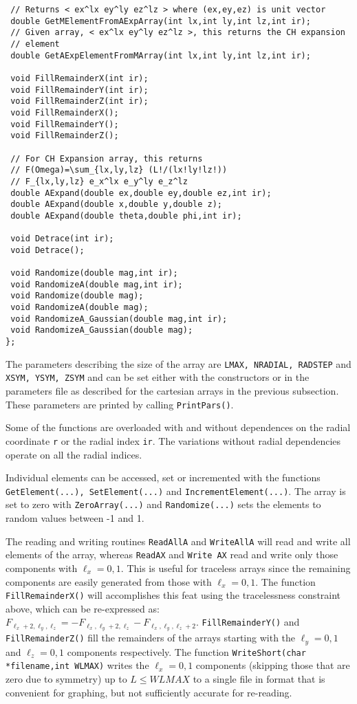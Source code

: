 \documentclass[10pt]{article}
\begin{document}
\begin{verbatim}
 // Returns < ex^lx ey^ly ez^lz > where (ex,ey,ez) is unit vector
 double GetMElementFromAExpArray(int lx,int ly,int lz,int ir);
 // Given array, < ex^lx ey^ly ez^lz >, this returns the CH expansion 
 // element 
 double GetAExpElementFromMArray(int lx,int ly,int lz,int ir);

 void FillRemainderX(int ir);
 void FillRemainderY(int ir);
 void FillRemainderZ(int ir);
 void FillRemainderX();
 void FillRemainderY();
 void FillRemainderZ();

 // For CH Expansion array, this returns
 // F(Omega)=\sum_{lx,ly,lz} (L!/(lx!ly!lz!))
 // F_{lx,ly,lz} e_x^lx e_y^ly e_z^lz
 double AExpand(double ex,double ey,double ez,int ir);
 double AExpand(double x,double y,double z);
 double AExpand(double theta,double phi,int ir);

 void Detrace(int ir);
 void Detrace();

 void Randomize(double mag,int ir);
 void RandomizeA(double mag,int ir);
 void Randomize(double mag);
 void RandomizeA(double mag); 
 void RandomizeA_Gaussian(double mag,int ir);
 void RandomizeA_Gaussian(double mag);
};
\end{verbatim}
The parameters describing the size of the array are {\tt LMAX, NRADIAL, RADSTEP} and {\tt XSYM, YSYM, ZSYM} and can be set either with the constructors or in the parameters file as described for the cartesian arrays in the previous subsection. These parameters are printed by calling {\tt PrintPars()}.

Some of the functions are overloaded with and without dependences on the radial coordinate {\tt r} or the radial index {\tt ir}. The variations without radial dependencies operate on all the radial indices.

Individual elements can be accessed, set or incremented with the functions {\tt GetElement(...), SetElement(...)} and {\tt IncrementElement(...)}. The array is set to zero with {\tt ZeroArray(...)} and {\tt Randomize(...)} sets the elements to random values between -1 and 1.

The reading and writing routines {\tt ReadAllA} and {\tt WriteAllA} will read and write all elements of the array, whereas {\tt ReadAX} and {\tt Write AX} read and write only those components with $\ell_x=0,1$. This is useful for traceless arrays since the remaining components are easily generated from those with $\ell_x=0,1$. The function {\tt FillRemainderX()} will accomplishes this feat using the tracelessness constraint above, which can be re-expressed as: $F_{\ell_x+2,\ell_y,\ell_z}=-F_{\ell_x,\ell_y+2,\ell_z}-F_{\ell_x,\ell_y,\ell_z+2}$. {\tt FillRemainderY()} and {\tt FillRemainderZ()} fill the remainders of the arrays starting with the $\ell_y=0,1$ and $\ell_z=0,1$ components respectively. The function {\tt WriteShort(char *filename,int WLMAX)} writes the $\ell_x=0,1$ components (skipping those that are zero due to symmetry) up to $L\le WLMAX$ to a single file in format that is convenient for graphing, but not sufficiently accurate for re-reading.
\end{document}
